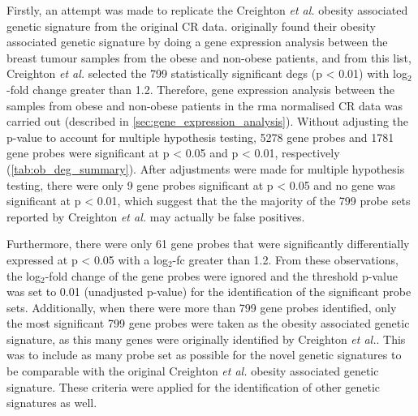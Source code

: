 Firstly, an attempt was made to replicate the Creighton \textit{et al.} obesity associated genetic signature from the original CR data.
\citet{Creighton2012} originally found their obesity associated genetic signature by doing a gene expression analysis between the breast tumour samples from the obese and non-obese patients, and from this list, Creighton \textit{et al.} selected the 799 statistically significant \glspl{deg} (p \textless{} 0.01) with log$_2$-fold change greater than 1.2.
Therefore, gene expression analysis  between the samples from obese and non-obese patients in the \gls{rma} normalised CR data was carried out (described in \cref{sec:gene_expression_analysis}).
Without adjusting the p-value to account for multiple hypothesis testing, 5278 gene probes and 1781 gene probes were significant at p \textless{} 0.05 and p \textless{} 0.01, respectively (\cref{tab:ob_deg_summary}).
After adjustments were made for multiple hypothesis testing, there were only 9 gene probes significant at p \textless{} 0.05 and no gene was significant at p \textless{} 0.01, which suggest that the the majority of the 799 probe sets reported by Creighton \textit{et al.} may actually be false positives.

Furthermore, there were only 61 gene probes that were significantly differentially expressed at p \textless{} 0.05 with a log$_2$-\gls{fc} greater than 1.2.
From these observations, the log$_2$-fold change of the gene probes were ignored and the threshold p-value was set to 0.01 (unadjusted p-value) for the identification of the significant probe sets.
Additionally, when there were more than 799 gene probes identified, only the most significant 799 gene probes were taken as the obesity associated genetic signature, as this many genes were originally identified by Creighton \textit{et al.}.
This was to include as many probe set as possible for the novel genetic signatures to be comparable with the original Creighton \textit{et al.} obesity associated genetic signature.
These criteria were applied for the identification of other genetic signatures as well.


